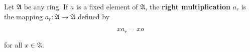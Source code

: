 Let $\mathfrak{A}$ be any ring. If $a$ is a fixed element of $\mathfrak{A}$, the \textbf{right multiplication} $a_r$ is the mapping $a_r: \mathfrak{A} \to \mathfrak{A}$ defined by

$$x a_r = xa$$

for all $x \in \mathfrak{A}$.
